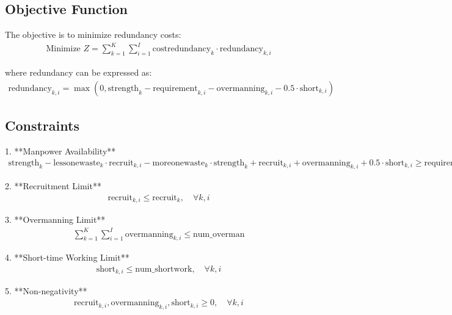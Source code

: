 \documentclass{article}
\begin{document}
\subsection*{Objective Function}
The objective is to minimize redundancy costs:
\begin{align*}
\text{Minimize } Z = \sum_{k=1}^{K} \sum_{i=1}^{I} \text{costredundancy}_{k} \cdot \text{redundancy}_{k, i}
\end{align*}

where redundancy can be expressed as:
\begin{align*}
\text{redundancy}_{k, i} = \max(0, \text{strength}_{k} - \text{requirement}_{k, i} - \text{overmanning}_{k, i} - 0.5 \cdot \text{short}_{k, i})
\end{align*}

\subsection*{Constraints}
1. **Manpower Availability**
\begin{align*}
\text{strength}_{k} - \text{lessonewaste}_{k} \cdot \text{recruit}_{k, i} - \text{moreonewaste}_{k} \cdot \text{strength}_{k} + \text{recruit}_{k, i} + \text{overmanning}_{k, i} + 0.5 \cdot \text{short}_{k, i} \geq \text{requirement}_{k, i}, \quad \forall k, i
\end{align*}

2. **Recruitment Limit**
\begin{align*}
\text{recruit}_{k, i} \leq \text{recruit}_{k}, \quad \forall k, i
\end{align*}

3. **Overmanning Limit**
\begin{align*}
\sum_{k=1}^{K} \sum_{i=1}^{I} \text{overmanning}_{k, i} \leq \text{num\_overman}
\end{align*}

4. **Short-time Working Limit**
\begin{align*}
\text{short}_{k, i} \leq \text{num\_shortwork}, \quad \forall k, i
\end{align*}

5. **Non-negativity**
\begin{align*}
\text{recruit}_{k, i}, \text{overmanning}_{k, i}, \text{short}_{k, i} \geq 0, \quad \forall k, i
\end{align*}
\end{document}
